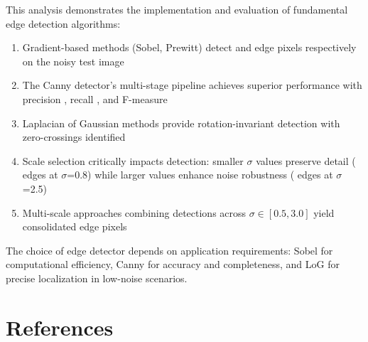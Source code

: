 \documentclass[a4paper, 11pt]{article}
\begin{document}
This analysis demonstrates the implementation and evaluation of fundamental edge detection algorithms:

\begin{enumerate}
\item Gradient-based methods (Sobel, Prewitt) detect  and 
      edge pixels respectively on the noisy test image
\item The Canny detector's multi-stage pipeline achieves superior performance with precision
      , recall , and F-measure 
\item Laplacian of Gaussian methods provide rotation-invariant detection with 
      zero-crossings identified
\item Scale selection critically impacts detection: smaller $\sigma$ values preserve detail
      ( edges at $\sigma$=0.8) while larger values enhance noise robustness
      ( edges at $\sigma$=2.5)
\item Multi-scale approaches combining detections across $\sigma \in [0.5, 3.0]$ yield
       consolidated edge pixels
\end{enumerate}

The choice of edge detector depends on application requirements: Sobel for computational efficiency,
Canny for accuracy and completeness, and LoG for precise localization in low-noise scenarios.

\section*{References}
\end{document}
